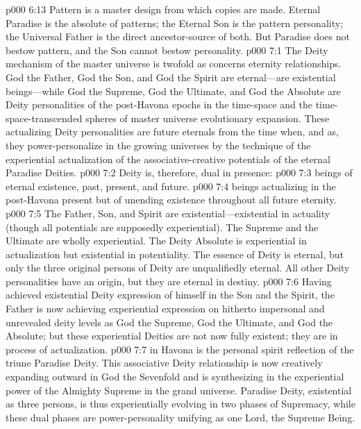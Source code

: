 \vs p000 6:13 Pattern is a master design from which copies are made. Eternal Paradise is the absolute of patterns; the Eternal Son is the pattern personality; the Universal Father is the direct ancestor\hyp{}source of both. But Paradise does not bestow pattern, and the Son cannot bestow personality.
\vs p000 7:1 The Deity mechanism of the master universe is twofold as concerns eternity relationships. God the Father, God the Son, and God the Spirit are eternal---are existential beings---while God the Supreme, God the Ultimate, and God the Absolute are  Deity personalities of the post\hyp{}Havona epochs in the time\hyp{}space and the time\hyp{}space\hyp{}transcended spheres of master universe evolutionary expansion. These actualizing Deity personalities are future eternals from the time when, and as, they power\hyp{}personalize in the growing universes by the technique of the experiential actualization of the associative\hyp{}creative potentials of the eternal Paradise Deities.
\vs p000 7:2 Deity is, therefore, dual in presence:
\pc \vs p000 7:3 \bibnobreakspace {}beings of eternal existence, past, present, and future.
\vs p000 7:4 \bibnobreakspace {}beings actualizing in the post\hyp{}Havona present but of unending existence throughout all future eternity.
\pc \vs p000 7:5 The Father, Son, and Spirit are ex\-is\-ten\-tial---ex\-is\-ten\-tial in actuality (though all potentials are supposedly experiential). The Supreme and the Ultimate are wholly experiential. The Deity Absolute is experiential in actualization but existential in potentiality. The essence of Deity is eternal, but only the three original persons of Deity are unqualifiedly eternal. All other Deity personalities have an origin, but they are eternal in destiny.
\vs p000 7:6 Having achieved existential Deity expression of himself in the Son and the Spirit, the Father is now achieving experiential expression on hitherto impersonal and unrevealed deity levels as God the Supreme, God the Ultimate, and God the Absolute; but these experiential Deities are not now fully existent; they are in process of actualization.
\pc \vs p000 7:7  in Havona is the personal spirit reflection of the triune Paradise Deity. This associative Deity relationship is now creatively expanding outward in God the Sevenfold and is synthesizing in the experiential power of the Almighty Supreme in the grand universe. Paradise Deity, existential as three persons, is thus experientially evolving in two phases of Supremacy, while these dual phases are power\hyp{}personality unifying as one Lord, the Supreme Being.

